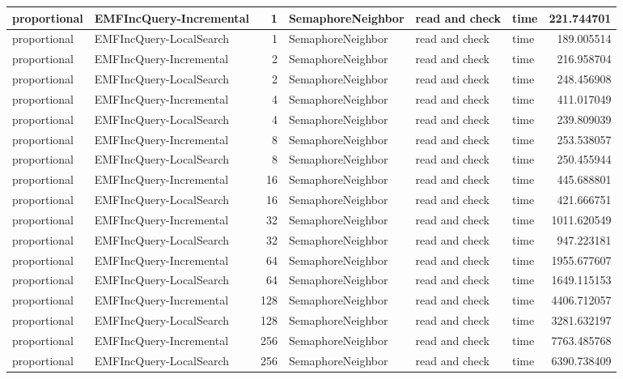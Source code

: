 \begin{table}
\begin{tabular}{| l | l | r | l | l | l | r |}
proportional & EMFIncQuery-Incremental & 1 & SemaphoreNeighbor & read and check & time & 221.744701\\\hline
proportional & EMFIncQuery-LocalSearch & 1 & SemaphoreNeighbor & read and check & time & 189.005514\\\hline
proportional & EMFIncQuery-Incremental & 2 & SemaphoreNeighbor & read and check & time & 216.958704\\\hline
proportional & EMFIncQuery-LocalSearch & 2 & SemaphoreNeighbor & read and check & time & 248.456908\\\hline
proportional & EMFIncQuery-Incremental & 4 & SemaphoreNeighbor & read and check & time & 411.017049\\\hline
proportional & EMFIncQuery-LocalSearch & 4 & SemaphoreNeighbor & read and check & time & 239.809039\\\hline
proportional & EMFIncQuery-Incremental & 8 & SemaphoreNeighbor & read and check & time & 253.538057\\\hline
proportional & EMFIncQuery-LocalSearch & 8 & SemaphoreNeighbor & read and check & time & 250.455944\\\hline
proportional & EMFIncQuery-Incremental & 16 & SemaphoreNeighbor & read and check & time & 445.688801\\\hline
proportional & EMFIncQuery-LocalSearch & 16 & SemaphoreNeighbor & read and check & time & 421.666751\\\hline
proportional & EMFIncQuery-Incremental & 32 & SemaphoreNeighbor & read and check & time & 1011.620549\\\hline
proportional & EMFIncQuery-LocalSearch & 32 & SemaphoreNeighbor & read and check & time & 947.223181\\\hline
proportional & EMFIncQuery-Incremental & 64 & SemaphoreNeighbor & read and check & time & 1955.677607\\\hline
proportional & EMFIncQuery-LocalSearch & 64 & SemaphoreNeighbor & read and check & time & 1649.115153\\\hline
proportional & EMFIncQuery-Incremental & 128 & SemaphoreNeighbor & read and check & time & 4406.712057\\\hline
proportional & EMFIncQuery-LocalSearch & 128 & SemaphoreNeighbor & read and check & time & 3281.632197\\\hline
proportional & EMFIncQuery-Incremental & 256 & SemaphoreNeighbor & read and check & time & 7763.485768\\\hline
proportional & EMFIncQuery-LocalSearch & 256 & SemaphoreNeighbor & read and check & time & 6390.738409\\\hline

\end{tabular}
\end{table}
